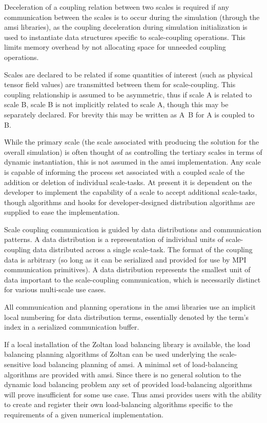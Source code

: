 \documentclass[11pt]{siamltex1213}
\begin{document}
Deceleration of a coupling relation between two scales is required if any communication between the scales is to occur during the simulation (through the amsi libraries), as the coupling deceleration during simulation initialization is used to instantiate data structures specific to scale-coupling operations. This limits memory overhead by not allocating space for unneeded coupling operations.

Scales are declared to be related if some quantities of interest (such as physical tensor field values) are transmitted between them for scale-coupling. This coupling relationship is assumed to be asymmetric, thus if scale A is related to scale B, scale B is not implicitly related to scale A, though this may be separately declared. For brevity this may be written as A~B for A is coupled to B.

While the primary scale (the scale associated with producing the solution for the overall simulation) is often thought of as controlling the tertiary scales in terms of dynamic instantiation, this is not assumed in the amsi implementation. Any scale is capable of informing the process set associated with a coupled scale of the addition or deletion of individual scale-tasks. At present it is dependent on the developer to implement the capability of a scale to accept additional scale-tasks, though algorithms and hooks for developer-designed distribution algorithms are supplied to ease the implementation.

\label{amsi_communication}
Scale coupling communication is guided by data distributions and communication patterns. A data distribution is a representation of individual units of scale-coupling data distributed across a single scale-task. The format of the coupling data is arbitrary (so long as it can be serialized and provided for use by MPI communication primitives). A data distribution represents the smallest unit of data important to the scale-coupling communication, which is necessarily distinct for various multi-scale use cases. 

All communication and planning operations in the amsi libraries use an implicit local numbering for data distribution terms, essentially denoted by the term's index in a serialized communication buffer.

\label{amsi_load_balancing}
If a local installation of the Zoltan \cite{ZoltanOverviewArticle2002} \cite{ZoltanIsorropiaOverview2012} load balancing library is available, the load balancing planning algorithms of Zoltan can be used underlying the scale-sensitive load balancing planning of amsi. A minimal set of load-balancing algorithms are provided with amsi. Since there is no general solution to the dynamic load balancing problem any set of provided load-balancing algorithms will prove insufficient for some use case. Thus amsi provides users with the ability to create and register their own load-balancing algorithms specific to the requirements of a given numerical implementation.
\end{document}
